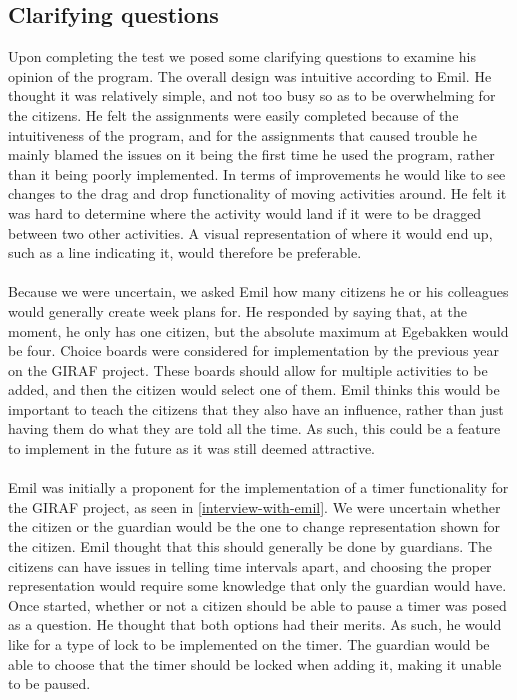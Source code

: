 \subsection{Clarifying questions}
Upon completing the test we posed some clarifying questions to examine his opinion of the program.
The overall design was intuitive according to Emil. He thought it was relatively simple, and not too busy so as to be overwhelming for the citizens.
He felt the assignments were easily completed because of the intuitiveness of the program, and for the assignments that caused trouble he mainly blamed the issues on it being the first time he used the program, rather than it being poorly implemented.
In terms of improvements he would like to see changes to the drag and drop functionality of moving activities around.
He felt it was hard to determine where the activity would land if it were to be dragged between two other activities.
A visual representation of where it would end up, such as a line indicating it, would therefore be preferable.
\\\\
Because we were uncertain, we asked Emil how many citizens he or his colleagues would generally create week plans for.
He responded by saying that, at the moment, he only has one citizen, but the absolute maximum at Egebakken would be four.
Choice boards were considered for implementation by the previous year on the GIRAF project.
These boards should allow for multiple activities to be added, and then the citizen would select one of them.
Emil thinks this would be important to teach the citizens that they also have an influence, rather than just having them do what they are told all the time.
As such, this could be a feature to implement in the future as it was still deemed attractive.
\\\\
Emil was initially a proponent for the implementation of a timer functionality for the GIRAF project, as seen in \autoref{interview-with-emil}.
We were uncertain whether the citizen or the guardian would be the one to change representation shown for the citizen.
Emil thought that this should generally be done by guardians.
The citizens can have issues in telling time intervals apart, and choosing the proper representation would require some knowledge that only the guardian would have.
Once started, whether or not a citizen should be able to pause a timer was posed as a question.
He thought that both options had their merits. 
As such, he would like for a type of lock to be implemented on the timer.
The guardian would be able to choose that the timer should be locked when adding it, making it unable to be paused.

